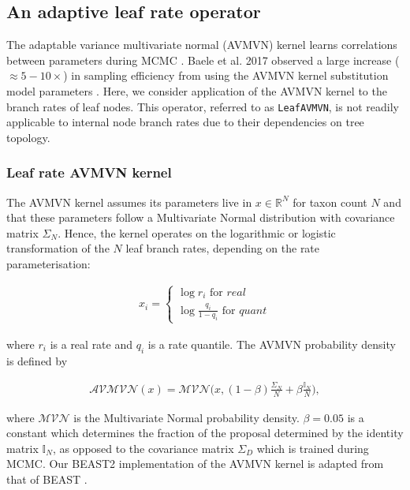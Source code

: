 \documentclass[10pt,letterpaper]{article}
\begin{document}
\clearpage
\subsection*{An adaptive leaf rate operator}
\label{AVMVN_sect}

The adaptable variance multivariate normal (AVMVN) kernel  learns correlations between parameters during MCMC \cite{baele2017adaptive,suchard2018bayesian}. 
Baele et al. 2017  observed a large increase ($\approx 5-10 \times$) in sampling efficiency from using the AVMVN kernel substitution model parameters \cite{baele2017adaptive}.  
Here, we consider application of the AVMVN kernel to the branch rates of leaf nodes. 
This operator, referred to as \texttt{LeafAVMVN}, is not readily applicable to internal node branch rates due to their dependencies on tree topology.  




\subsubsection*{Leaf rate AVMVN kernel}


The AVMVN kernel assumes its parameters live in $x \in \mathbb{R}^N$ for taxon count $N$ and that these parameters follow a Multivariate Normal distribution with covariance matrix $\Sigma_N$. Hence, the kernel operates on the logarithmic or logistic transformation of the $N$ leaf branch rates, depending on the rate parameterisation:

\begin{align}
	x_i = \begin{cases} \log r_i \text{ for } \textit{real} \\
						\log \frac{q_i}{1 - q_i} \text{ for } \textit{quant}  \end{cases}
\end{align}

where $r_i$ is a real rate and $q_i$ is a rate quantile. The AVMVN probability density is defined by 


\begin{align}
	\mathcal{AVMVN}(x) =  \mathcal{MVN}\big(x, (1-\beta) \frac{\Sigma_N}{N} + \beta \frac{\mathbb{I}_N}{N} \big) ,
\end{align}


where $\mathcal{MVN}$ is the Multivariate Normal probability density. $\beta  = 0.05$ is a constant which determines the fraction of the proposal determined by the identity matrix $\mathbb{I}_N$, as opposed to the covariance matrix $\Sigma_D$ which is trained during MCMC.
Our BEAST2 implementation of the AVMVN kernel is adapted from that of BEAST \cite{suchard2018bayesian}.
\end{document}
